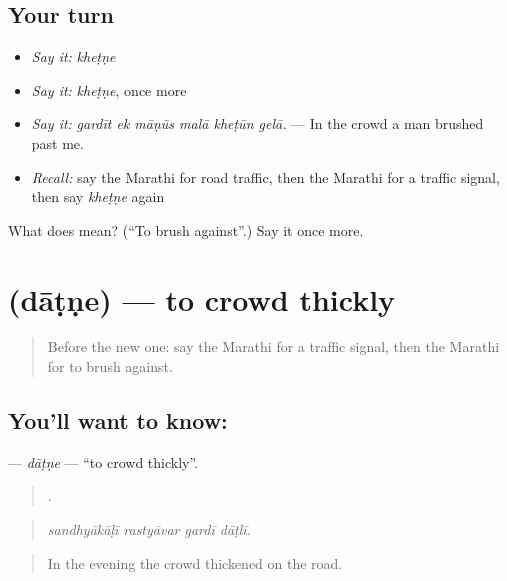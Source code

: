\subsection*{Your turn}
\begin{itemize}
\raggedright
  \item \emph{Say it:} \emph{kheṭṇe}
  \item \emph{Say it:} \emph{kheṭṇe}, once more
  \item \emph{Say it:} \emph{gardīt ek māṇūs malā kheṭūn gelā.} — In the crowd a man brushed past me.
  \item \emph{Recall:} say the Marathi for road traffic, then the Marathi for a traffic signal, then say \emph{kheṭṇe} again
\end{itemize}

\begin{tcolorbox}[breakable,colback=teal!4,colframe=teal!35!black,title={Before you move on}]
What does  mean? (\textquotedblleft{}To brush against\textquotedblright{}.) Say it once more.
\end{tcolorbox}
\section[\texorpdfstring{\mr{दाटणे} (dāṭṇe)}{दाटणे (dāṭṇe)}]{ (dāṭṇe) — to crowd thickly}

\label{lesson:MR-C404-datne}



\begin{quote}
Before the new one: say the Marathi for a traffic signal, then the Marathi for to brush against.
\end{quote}

\subsection*{You'll want to know: }
\textbf{} — \emph{dāṭṇe} — \textquotedblleft{}to crowd thickly\textquotedblright{}.

\begin{quote}
   .
\end{quote}

\begin{quote}
\emph{sandhyākāḷī rastyāvar gardī dāṭlī.}
\end{quote}

\begin{quote}
In the evening the crowd thickened on the road.
\end{quote}

